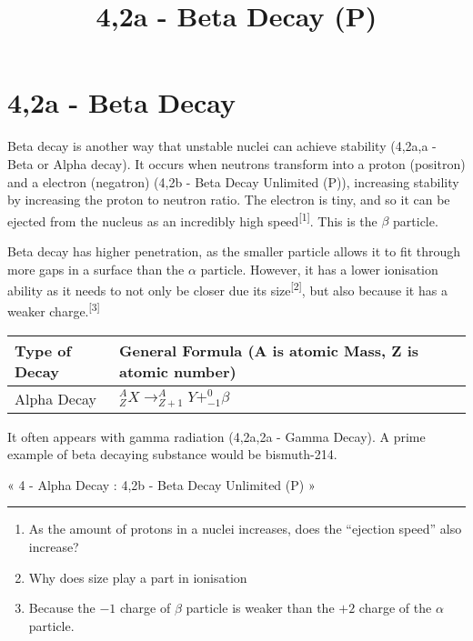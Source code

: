 \documentclass[
]{article}
\title{4,2a - Beta Decay (P)}
\author{}
\date{}
\providecommand{\tightlist}{%
  \setlength{\itemsep}{0pt}\setlength{\parskip}{0pt}}
\begin{document}
\maketitle

\hypertarget{a---beta-decay}{%
\section{4,2a - Beta Decay}\label{a---beta-decay}}

Beta decay is another way that unstable nuclei can achieve stability
(4,2a,a - Beta or Alpha decay). It occurs when neutrons transform into a
proton (positron) and a electron (negatron) (4,2b - Beta Decay Unlimited
(P)), increasing stability by increasing the proton to neutron ratio.
The electron is tiny, and so it can be ejected from the nucleus as an
incredibly high speed\textsuperscript{{[}1{]}}. This is the {\(\beta\)}
particle.

Beta decay has higher penetration, as the smaller particle allows it to
fit through more gaps in a surface than the {\(\alpha\)} particle.
However, it has a lower ionisation ability as it needs to not only be
closer due its size\textsuperscript{{[}2{]}}, but also because it has a
weaker charge.\textsuperscript{{[}3{]}}

\begin{longtable}[]{@{}ll@{}}
\toprule()
Type of Decay & General Formula (A is atomic Mass, Z is atomic
number) \\
\midrule()
\endhead
Alpha Decay &
{\(_{Z}^{A}X \rightarrow_{Z + 1}^{A}Y +_{- 1}^{0}\beta\)} \\
\bottomrule()
\end{longtable}

It often appears with gamma radiation (4,2a,2a - Gamma Decay). A prime
example of beta decaying substance would be bismuth-214.

« 4 - Alpha Decay : 4,2b - Beta Decay Unlimited (P) »

\begin{center}\rule{0.5\linewidth}{0.5pt}\end{center}

\begin{enumerate}
\tightlist
\item
  \protect\hypertarget{fn-1-4ab4ebdaf9a4c5a0}{}{As the amount of protons
  in a nuclei increases, does the ``ejection speed'' also increase?}
\item
  \protect\hypertarget{fn-2-4ab4ebdaf9a4c5a0}{}{Why does size play a
  part in ionisation}
\item
  \protect\hypertarget{fn-3-4ab4ebdaf9a4c5a0}{}{Because the {\(- 1\)}
  charge of {\(\beta\)} particle is weaker than the {\(+ 2\)} charge of
  the {\(\alpha\)} particle.}
\end{enumerate}
\end{document}
